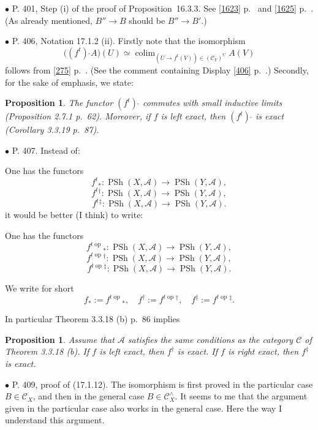 \documentclass[12pt]{article}
\newtheorem{prop}[thm]{Proposition}
\theoremstyle{remark}%
\newcommand{\bu}{\bullet}
\newcommand{\n}{\noindent}
\newcommand{\A}{\mathcal A}
\newcommand{\C}{\mathcal C}
\newcommand{\pr}{Proposition}
\DeclareMathOperator*{\co}{colim}
\DeclareMathOperator{\op}{op}
\DeclareMathOperator{\PSh}{PSh}
\begin{document}

\n$\bu$ P. 401, Step (i) of the proof of \pr\ 16.3.3. See \eqref{1623} p.~\pageref{1623} and \eqref{1625} p.~\pageref{1625}. (As already mentioned, $B''\to B$ should be $B''\to B'$.)


\n$\bu$ P. 406, Notation 17.1.2 (ii). Firstly note that the isomorphism 
$$
\big((f^t)\ \widehat{}A\big)(U)\simeq\co_{(U\to f^t(V))\in(\C_Y)^U}A(V)
$$
follows from \eqref{275} p.~\pageref{275}. (See the comment containing Display \eqref{406} p.~\pageref{406}.) Secondly, for the sake of emphasis, we state: 
%
\begin{prop}\label{p406}
The functor $(f^t)\ \widehat{}$ commutes with small inductive limits (Proposition 2.7.1 p.~62). Moreover, if $f$ is left exact, then $(f^t)\ \widehat{}$ is exact (Corollary 3.3.19 p.~87).
\end{prop}


\n$\bu$ P. 407. Instead of:

One has the functors 
$$
f^t{}_*:\PSh(X,\A)\to\PSh(Y,\A),
$$
$$
f^t{}^\dagger:\PSh(X,\A)\to\PSh(Y,\A),
$$
$$
f^t{}^\ddagger:\PSh(X,\A)\to\PSh(Y,\A).
$$ 
it would be better (I think) to write:

One has the functors 
$$
f^{t\op}{}_*:\PSh(X,\A)\to\PSh(Y,\A),
$$
$$
f^{t\op}{}^\dagger:\PSh(X,\A)\to\PSh(Y,\A),
$$
$$
f^{t\op}{}^\ddagger:\PSh(X,\A)\to\PSh(Y,\A).
$$ 

We write for short 
$$
f_*:=f^{t\op}{}_*,\quad f^\dagger:=f^{t\op}{}^\dagger,\quad f^\ddagger:=f^{t\op}{}^\ddagger.
$$

In particular Theorem 3.3.18 (b) p.~86 implies 
%
\begin{prop}\label{407}
Assume that $\A$ satisfies the same conditions as the category $\C$ of Theorem 3.3.18 (b). If $f$ is left exact, then $f^\dagger$ is exact. If $f$ is right exact, then $f^\ddagger$ is exact. 
\end{prop}

\n$\bu$ P. 409, proof of (17.1.12). The isomorphism is first proved in the particular case $B\in\C_X$, and then in the general case $B\in\C_X^\wedge$. It seems to me that the argument given in the particular case also works in the general case. Here the way I understand this argument. 
\end{document}
